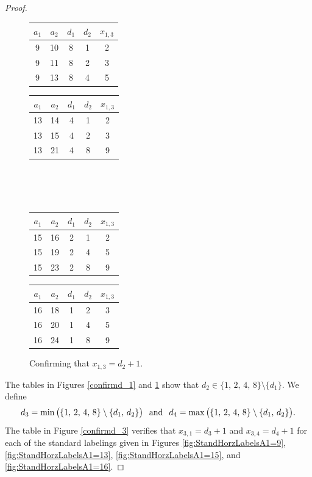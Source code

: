 \documentclass[10pt, reqno]{amsart}
\theoremstyle{definition}
\theoremstyle{plain}
\begin{document}
\begin{proof}
\begin{figure}[hbt!]
\centering
\renewcommand{\arraystretch}{1.5}
\begin{tabular}{|c|c|c|c|c|} \hline
  $a_1$ & $a_2$  & $d_1$ & $d_2$ & $x_{1,3}$ \\  \hline
    9  &  10 & 8 & 1 & 2  \\  \hline
     9 &  11 & 8  &  2 & 3 \\  \hline
     9 &    13 & 8 & 4 & 5  \\  \hline
    \end{tabular}\hspace{0.15in}
  \begin{tabular}{|c|c|c|c|c|} \hline
  $a_1$ & $a_2$ & $d_1$ & $d_2$ & $x_{1,3}$ \\  \hline
    13  &  14 & 4 & 1 & 2  \\  \hline
     13 &  15 & 4  &  2 & 3 \\  \hline
     13 &    21 & 4  & 8 & 9  \\  \hline
    \end{tabular}  
\hspace{2in}\\
\hspace{2in}\\
\hspace{2in}\\
\begin{tabular}{|c|c|c|c|c|} \hline
  $a_1$ & $a_2$ & $d_1$ & $d_2$ & $x_{1,3}$ \\  \hline
    15  &  16 & 2 & 1 & 2  \\  \hline
     15 &  19 & 2  &  4 & 5 \\  \hline
     15 &    23 & 2  & 8 & 9  \\  \hline
    \end{tabular}\hspace{0.15in}
\begin{tabular}{|c|c|c|c|c|} \hline
  $a_1$ & $a_2$ & $d_1$  & $d_2$ & $x_{1,3}$ \\  \hline
    16  &  18 & 1  & 2 & 3  \\  \hline
     16 &  20 & 1  &  4 & 5 \\  \hline
     16 &    24 & 1  & 8 & 9  \\  \hline
    \end{tabular}
    \caption{Confirming that $x_{1,3}=d_2+1$.}\label{confirmd_2}
\end{figure}

The tables in Figures \ref{confirmd_1} and \ref{confirmd_2} show that $d_2 \in \{ 1,\, 2,\, 4,\, 8\}\setminus \{d_1\}$. We define
\begin{equation*}
  d_3= \min\big(\{ 1,\, 2,\, 4,\, 8\}\setminus \{d_1,\, d_2\}\big)\hspace{.1in}\text{and}\hspace{.1in}d_4= \max\big(\{ 1,\, 2,\, 4,\, 8\}\setminus \{d_1,\, d_2\}\big).   
\end{equation*}
The table in Figure \ref{confirmd_3} verifies that $x_{3,1}=d_3+1$ and $x_{3,4}=d_4+1$ for each of the
standard labelings given in Figures \ref{fig:StandHorzLabelsA1=9}, \ref{fig:StandHorzLabelsA1=13}, 
\ref{fig:StandHorzLabelsA1=15}, and \ref{fig:StandHorzLabelsA1=16}.


\end{proof}
\end{document}
